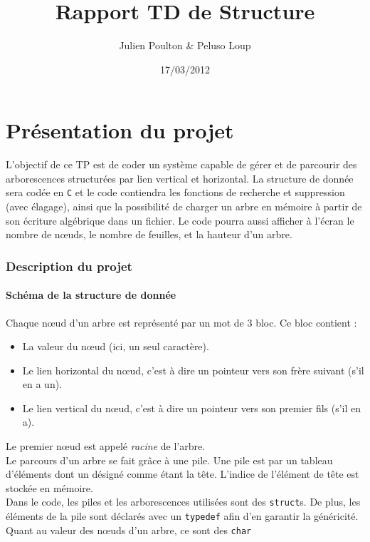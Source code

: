 \documentclass[a4paper,11pt] {article}
\title{Rapport TD de Structure}
\author{Julien Poulton & Peluso Loup}
\date{17/03/2012}
\begin{document}
\part{Présentation du projet}

  L'objectif de ce TP est de coder un système capable de gérer et de parcourir des arborescences structurées par lien vertical et horizontal. La structure de donnée sera codée en \verb?C? et le code contiendra les fonctions de recherche et suppression (avec élagage), ainsi que la possibilité de charger un arbre en mémoire à partir de son écriture algébrique dans un fichier. Le code pourra aussi afficher à l'écran le nombre de nœuds, le nombre de feuilles, et la hauteur d'un arbre.

\section{Description du projet}

\subsection{Schéma de la structure de donnée}

Chaque nœud d'un arbre est représenté par un mot de 3 bloc. Ce bloc contient :

\vspace{0.5cm}
	
\begin{itemize}
\item La valeur du nœud (ici, un seul caractère).
\item Le lien horizontal du nœud, c'est à dire un pointeur vers son frère suivant (s'il en a un).
\item Le lien vertical du nœud, c'est à dire un pointeur vers son premier fils (s'il en a).
\end{itemize}

\vspace{0.5cm}

Le premier nœud est appelé \emph{racine} de l'arbre.\\

Le parcours d'un arbre se fait grâce à une pile. Une pile est par un tableau d'éléments dont un désigné comme étant la tête. L'indice de l'élément de tête est stockée en mémoire.\\

Dans le code, les piles et les arborescences utilisées sont des \verb#struct#s. De plus, les éléments de la pile sont déclarés avec un \verb#typedef# afin d'en garantir la généricité.
%
%
Quant au valeur des nœuds d'un arbre, ce sont des \verb?char?
%
\end{document}

